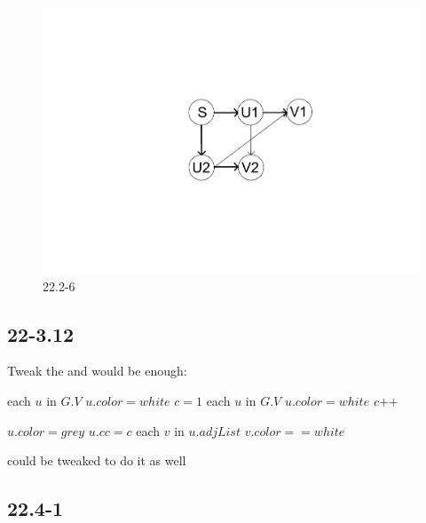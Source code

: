 \documentclass[]{article}
\begin{document}
\begin{figure}
	\centering
	\includegraphics[width=\linewidth]{2226}
	\caption{22.2-6}
	\label{fig:22.2-6}
\end{figure}

\subsection{22-3.12}

Tweak the  and  would be enough:

\begin{codebox}
	
	\li	\For each $u$ in $G.V$
	\li \Do $u.color = white$
	\End
	\li $c=1$
	\li	\For each $u$ in $G.V$
	\li \Do \If $u.color = white$
	\li \Then {}
	\li $c$++
	\End
	\End
	
\end{codebox}

\begin{codebox}
	
	\li $u.color = grey$
	\li $u.cc = c$
	\li	\For each $v$ in $u.adjList$
	\li \Do \If $v.color == white$
	\li 	\Then {}
	\End
	\End
	
\end{codebox}

 could be tweaked to do it as well

\subsection{22.4-1}
\end{document}
